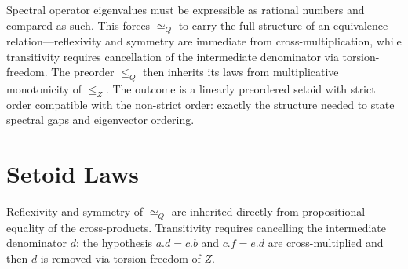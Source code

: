 \documentclass[11pt,a4paper]{book}
\def\cdot{.}%
\def\mathbb#1{#1}%
\begin{document}
Spectral operator eigenvalues must be expressible as rational numbers and compared as such. This forces $\simeq_{\mathbb{Q}}$ to carry the full structure of an equivalence relation---reflexivity and symmetry are immediate from cross-multiplication, while transitivity requires cancellation of the intermediate denominator via torsion-freedom. The preorder $\le_{\mathbb{Q}}$ then inherits its laws from multiplicative monotonicity of $\le_{\mathbb{Z}}$. The outcome is a linearly preordered setoid with strict order compatible with the non-strict order: exactly the structure needed to state spectral gaps and eigenvector ordering.

\section{Setoid Laws}

Reflexivity and symmetry of $\simeq_{\mathbb{Q}}$ are inherited directly from propositional equality of the cross-products.
Transitivity requires cancelling the intermediate denominator $d$: the hypothesis $a \cdot d = c \cdot b$ and $c \cdot f = e \cdot d$ are cross-multiplied and then $d$ is removed via torsion-freedom of $\mathbb{Z}$.
\end{document}
